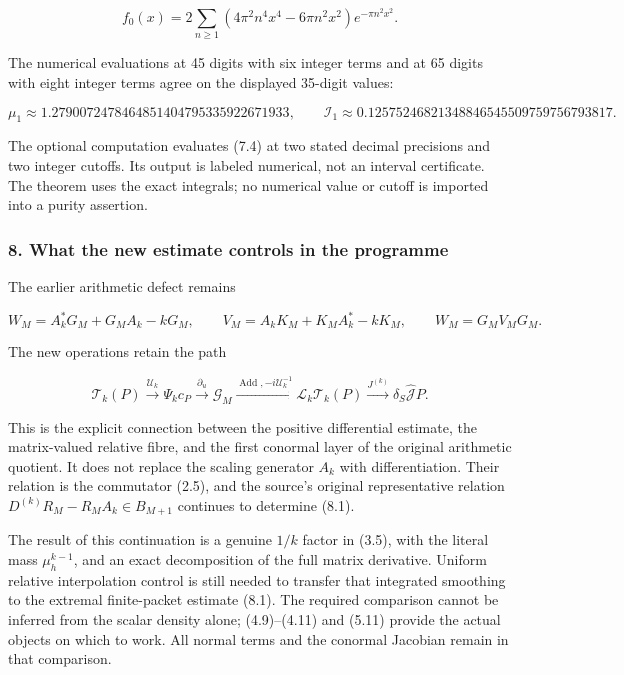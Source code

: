 \[f_0(x)=2\sum_{n\ge1}(4\pi^2n^4x^4-6\pi n^2x^2)e^{-\pi n^2x^2}.\]

The numerical evaluations at 45 digits with six integer terms and at 65
digits with eight integer terms agree on the displayed 35-digit values:

\begingroup\small
\[\mu_1\approx1.2790072478464851404795335922671933,\qquad
\mathcal I_1\approx0.12575246821348846545509759756793817.\]
\endgroup

The optional computation evaluates (7.4) at two stated decimal
precisions and two integer cutoffs. Its output is labeled numerical, not
an interval certificate. The theorem uses the exact integrals; no
numerical value or cutoff is imported into a purity assertion.

\subsubsection{8. What the new estimate controls in the
programme}\label{sum_connection:what-the-new-estimate-controls-in-the-programme}

The earlier arithmetic defect remains

\[W_M=A_k^*G_M+G_MA_k-kG_M,\qquad V_M=A_kK_M+K_MA_k^*-kK_M,\qquad W_M=G_MV_MG_M.\tag{8.1}\]

The new operations retain the path

\[\mathcal T_k(P)\xrightarrow{\mathscr U_k}\Psi_k c_P
\xrightarrow{\partial_u}\mathscr G_M
\xrightarrow{\operatorname{Add},-i\mathscr U_k^{-1}}\mathscr L_k\mathcal T_k(P)
\xrightarrow{J^{(k)}}\delta_S\widehat{\mathcal J}P.\tag{8.2}\]

This is the explicit connection between the positive differential
estimate, the matrix-valued relative fibre, and the first conormal layer
of the original arithmetic quotient. It does not replace the scaling
generator \(A_k\) with differentiation. Their relation is the commutator
(2.5), and the source's original representative relation
\(D^{(k)}R_M-R_MA_k\in B_{M+1}\) continues to determine (8.1).

The result of this continuation is a genuine \(1/k\) factor in (3.5),
with the literal mass \(\mu_h^{k-1}\), and an exact decomposition of the
full matrix derivative. Uniform relative interpolation control is still
needed to transfer that integrated smoothing to the extremal
finite-packet estimate (8.1). The required comparison cannot be inferred
from the scalar density alone; (4.9)--(4.11) and (5.11) provide the
actual objects on which to work. All normal terms and the conormal
Jacobian remain in that comparison.

